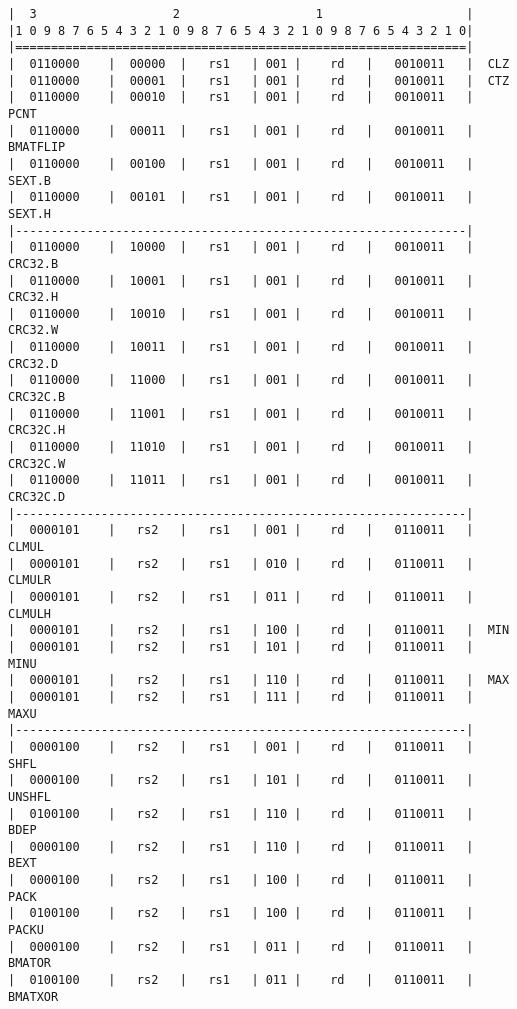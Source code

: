 \begin{minipage}{\linewidth}
\begin{verbatim}
|  3                   2                   1                    |
|1 0 9 8 7 6 5 4 3 2 1 0 9 8 7 6 5 4 3 2 1 0 9 8 7 6 5 4 3 2 1 0|
|===============================================================|
|  0110000    |  00000  |   rs1   | 001 |    rd   |   0010011   |  CLZ
|  0110000    |  00001  |   rs1   | 001 |    rd   |   0010011   |  CTZ
|  0110000    |  00010  |   rs1   | 001 |    rd   |   0010011   |  PCNT
|  0110000    |  00011  |   rs1   | 001 |    rd   |   0010011   |  BMATFLIP
|  0110000    |  00100  |   rs1   | 001 |    rd   |   0010011   |  SEXT.B
|  0110000    |  00101  |   rs1   | 001 |    rd   |   0010011   |  SEXT.H
|---------------------------------------------------------------|
|  0110000    |  10000  |   rs1   | 001 |    rd   |   0010011   |  CRC32.B
|  0110000    |  10001  |   rs1   | 001 |    rd   |   0010011   |  CRC32.H
|  0110000    |  10010  |   rs1   | 001 |    rd   |   0010011   |  CRC32.W
|  0110000    |  10011  |   rs1   | 001 |    rd   |   0010011   |  CRC32.D
|  0110000    |  11000  |   rs1   | 001 |    rd   |   0010011   |  CRC32C.B
|  0110000    |  11001  |   rs1   | 001 |    rd   |   0010011   |  CRC32C.H
|  0110000    |  11010  |   rs1   | 001 |    rd   |   0010011   |  CRC32C.W
|  0110000    |  11011  |   rs1   | 001 |    rd   |   0010011   |  CRC32C.D
|---------------------------------------------------------------|
|  0000101    |   rs2   |   rs1   | 001 |    rd   |   0110011   |  CLMUL
|  0000101    |   rs2   |   rs1   | 010 |    rd   |   0110011   |  CLMULR
|  0000101    |   rs2   |   rs1   | 011 |    rd   |   0110011   |  CLMULH
|  0000101    |   rs2   |   rs1   | 100 |    rd   |   0110011   |  MIN
|  0000101    |   rs2   |   rs1   | 101 |    rd   |   0110011   |  MINU
|  0000101    |   rs2   |   rs1   | 110 |    rd   |   0110011   |  MAX
|  0000101    |   rs2   |   rs1   | 111 |    rd   |   0110011   |  MAXU
|---------------------------------------------------------------|
|  0000100    |   rs2   |   rs1   | 001 |    rd   |   0110011   |  SHFL
|  0000100    |   rs2   |   rs1   | 101 |    rd   |   0110011   |  UNSHFL
|  0100100    |   rs2   |   rs1   | 110 |    rd   |   0110011   |  BDEP
|  0000100    |   rs2   |   rs1   | 110 |    rd   |   0110011   |  BEXT
|  0000100    |   rs2   |   rs1   | 100 |    rd   |   0110011   |  PACK
|  0100100    |   rs2   |   rs1   | 100 |    rd   |   0110011   |  PACKU
|  0000100    |   rs2   |   rs1   | 011 |    rd   |   0110011   |  BMATOR
|  0100100    |   rs2   |   rs1   | 011 |    rd   |   0110011   |  BMATXOR

\end{verbatim}
\end{minipage}
